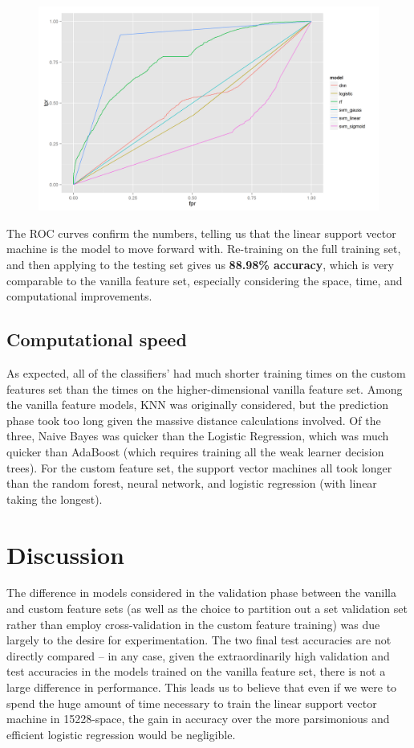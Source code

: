 \documentclass{article} %
\begin{document}
\begin{figure}[h]
\centering
\includegraphics[width=150mm]{roc_custom.png}
\end{figure}
The ROC curves confirm the numbers, telling us that the linear support vector machine is the model to move forward with.  Re-training on the full training set, and then applying to the testing set gives us \textbf{88.98\% accuracy}, which is very comparable to the vanilla feature set, especially considering the space, time, and computational improvements.
\subsection{Computational speed}
As expected, all of the classifiers' had much shorter training times on the custom features set than the times on the higher-dimensional vanilla feature set.  Among the vanilla feature models, KNN was originally considered, but the prediction phase took too long given the massive distance calculations involved.  Of the three, Naive Bayes was quicker than the Logistic Regression, which was much quicker than AdaBoost (which requires training all the weak learner decision trees).  For the custom feature set, the support vector machines all took longer than the random forest, neural network, and logistic regression (with linear taking the longest).
\section{Discussion}
The difference in models considered in the validation phase between the vanilla and custom feature sets (as well as the choice to partition out a set validation set rather than employ cross-validation in the custom feature training) was due largely to the desire for experimentation.  The two final test accuracies are not directly compared -- in any case, given the extraordinarily high validation and test accuracies in the models trained on the vanilla feature set, there is not a large difference in performance.  This leads us to believe that even if we were to spend the huge amount of time necessary to train the linear support vector machine in 15228-space, the gain in accuracy over the more parsimonious and efficient logistic regression would be negligible.
\end{document}
